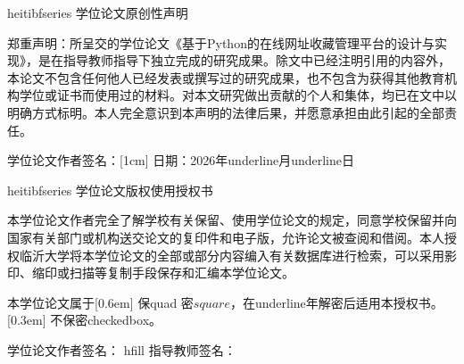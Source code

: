 \documentclass[12pt,a4paper]{ctexart}
\begin{document}
\clearpage
\thispagestyle{empty}
\begin{center}
    {heitibfseries 学位论文原创性声明}
\end{center}

\vspace{1cm}

郑重声明：所呈交的学位论文《基于Python的在线网址收藏管理平台的设计与实现》，是在指导教师指导下独立完成的研究成果。除文中已经注明引用的内容外，本论文不包含任何他人已经发表或撰写过的研究成果，也不包含为获得其他教育机构学位或证书而使用过的材料。对本文研究做出贡献的个人和集体，均已在文中以明确方式标明。本人完全意识到本声明的法律后果，并愿意承担由此引起的全部责任。

\vspace{3cm}

\begin{flushright}
学位论文作者签名：\underline{\hspace{4cm}}[1cm]
日期：2026年underline{\hspace{1cm}}月underline{\hspace{1cm}}日
\end{flushright}

\clearpage
\thispagestyle{empty}
\begin{center}
    {heitibfseries 学位论文版权使用授权书}
\end{center}

\vspace{1cm}

本学位论文作者完全了解学校有关保留、使用学位论文的规定，同意学校保留并向国家有关部门或机构送交论文的复印件和电子版，允许论文被查阅和借阅。本人授权临沂大学将本学位论文的全部或部分内容编入有关数据库进行检索，可以采用影印、缩印或扫描等复制手段保存和汇编本学位论文。

\vspace{1cm}

\noindent 本学位论文属于[0.6em]
\noindent 保quad 密$square$，在underline{\hspace{1.5cm}}年解密后适用本授权书。[0.3em]
\noindent 不保密checkedbox。

\vspace{2.5cm}

\noindent 学位论文作者签名：\underline{\hspace{3.8cm}} hfill 指导教师签名：\underline{\hspace{3.8cm}}
\end{document}
